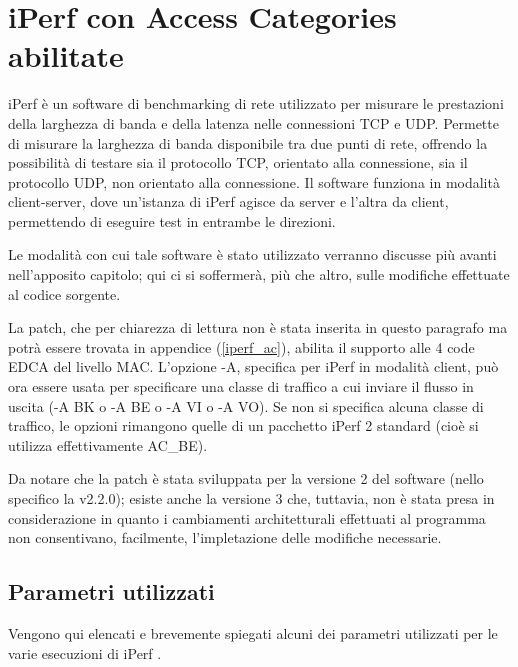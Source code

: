 \section{iPerf con Access Categories abilitate}
iPerf è un software di benchmarking di rete utilizzato per misurare le prestazioni della larghezza di banda e della latenza nelle connessioni TCP e UDP. Permette di misurare la larghezza di banda disponibile tra due punti di rete, offrendo la possibilità di testare sia il protocollo TCP, orientato alla connessione, sia il protocollo UDP, non orientato alla connessione. Il software funziona in modalità client-server, dove un'istanza di iPerf agisce da server e l'altra da client, permettendo di eseguire test in entrambe le direzioni.

Le modalità con cui tale software è stato utilizzato verranno discusse più avanti nell'apposito capitolo; qui ci si soffermerà, più che altro, sulle modifiche effettuate al codice sorgente.

La patch, che per chiarezza di lettura non è stata inserita in questo paragrafo ma potrà essere trovata in appendice (\autoref{iperf_ac}), abilita il supporto alle 4 code EDCA del livello MAC. L'opzione -A, specifica per iPerf in modalità client, può ora essere usata per specificare una classe di traffico a cui inviare il flusso in uscita (-A BK o -A BE o -A VI o -A VO). Se non si specifica alcuna classe di traffico, le opzioni rimangono quelle di un pacchetto iPerf 2 standard (cioè si utilizza effettivamente AC\_BE).

Da notare che la patch è stata sviluppata per la versione 2 del software (nello specifico la v2.2.0); esiste anche la versione 3 che, tuttavia, non è stata presa in considerazione in quanto i cambiamenti architetturali effettuati al programma non consentivano, facilmente, l'impletazione delle modifiche necessarie.

\subsection[Parametri utilizzati]{Parametri utilizzati}
Vengono qui elencati e brevemente spiegati alcuni dei parametri utilizzati per le varie esecuzioni di iPerf \cite{iperf}.


